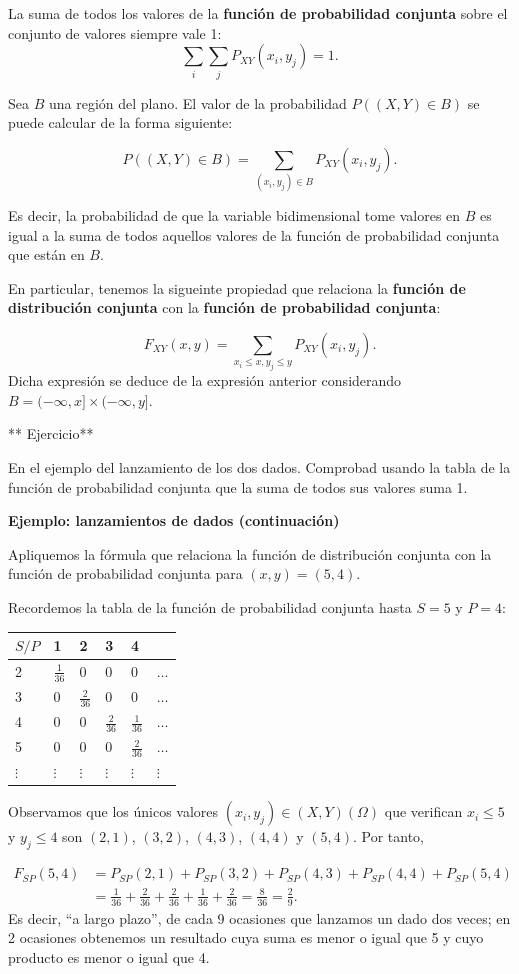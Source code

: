 \documentclass[]{book}
\begin{document}
La suma de todos los valores de la \textbf{función de probabilidad conjunta} sobre el conjunto de valores siempre vale 1: \[\sum_{i}\sum_j P_{XY}(x_i,y_j)=1.\]

Sea \(B\) una región del plano. El valor de la probabilidad \(P((X,Y)\in B)\) se puede calcular de la forma siguiente:

\[
P((X,Y)\in B) =\sum_{(x_i,y_j)\in B} P_{XY}(x_i,y_j).
\]

Es decir, la probabilidad de que la variable bidimensional tome valores en \(B\) es igual a la suma de todos aquellos valores de la función de probabilidad conjunta que están en \(B\).

En particular, tenemos la sigueinte propiedad que relaciona la \textbf{función de distribución conjunta} con la \textbf{función de probabilidad conjunta}:

\[
F_{XY}(x,y)=\sum_{x_i\leq x, y_j\leq y} P_{XY}(x_i,y_j).
\]
Dicha expresión se deduce de la expresión anterior considerando \(B=(-\infty,x]\times (-\infty,y]\).

** Ejercicio**

En el ejemplo del lanzamiento de los dos dados. Comprobad usando la tabla de la función de probabilidad conjunta que la suma de todos sus valores suma 1.

\textbf{Ejemplo: lanzamientos de dados (continuación)}

Apliquemos la fórmula que relaciona la función de distribución conjunta con la función de probabilidad conjunta para \((x,y)=(5,4)\).

Recordemos la tabla de la función de probabilidad conjunta hasta \(S=5\) y \(P=4\):

\begin{longtable}[]{@{}llllll@{}}
\toprule
\(S/P\) & 1 & 2 & 3 & 4 &\tabularnewline
\midrule
\endhead
2 & \(\frac{1}{36}\) & 0 & 0 & 0 & \(\ldots\)\tabularnewline
3 & 0 & \(\frac{2}{36}\) & 0 & 0 & \(\ldots\)\tabularnewline
4 & 0 & 0 & \(\frac{2}{36}\) & \(\frac{1}{36}\) & \(\ldots\)\tabularnewline
5 & 0 & 0 & 0 & \(\frac{2}{36}\) & \(\ldots\)\tabularnewline
\(\vdots\) & \(\vdots\) & \(\vdots\) & \(\vdots\) & \(\vdots\) & \(\vdots\)\tabularnewline
\bottomrule
\end{longtable}

Observamos que los únicos valores \((x_i,y_j)\in (X,Y)(\Omega)\) que verifican \(x_i\leq 5\) y \(y_j\leq 4\) son \((2,1)\), \((3,2)\), \((4,3)\), \((4,4)\) y \((5,4)\). Por tanto,

\[
\begin{array}{rl}
F_{SP}(5,4) &= P_{SP}(2,1)+P_{SP}(3,2)+P_{SP}(4,3)+P_{SP}(4,4)+P_{SP}(5,4) \\ & = \frac{1}{36}+\frac{2}{36}+\frac{2}{36}+\frac{1}{36}+\frac{2}{36} = \frac{8}{36}=\frac{2}{9}.
\end{array}
\]
Es decir, ``a largo plazo'', de cada 9 ocasiones que lanzamos un dado dos veces; en 2 ocasiones obtenemos un resultado cuya suma es menor o igual que 5 y cuyo producto es menor o igual que 4.
\end{document}
